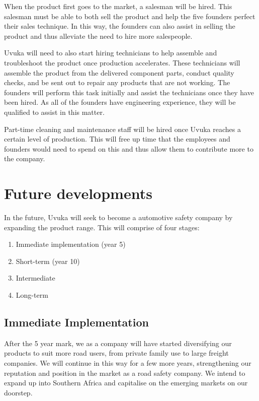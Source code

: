 When the product first goes to the market, a salesman will be hired. This salesman must be able to both sell the product and help the five founders perfect their sales technique. In this way, the founders can also assist in selling the product and thus alleviate the need to hire more salespeople.

Uvuka will need to also start hiring technicians to help assemble and troubleshoot the product once production accelerates. These technicians will assemble the product from the delivered component parts, conduct quality checks, and be sent out to repair any products that are not working. The founders will perform this task initially and assist the technicians once they have been hired. As all of the founders have engineering experience, they will be qualified to assist in this matter.

Part-time cleaning and maintenance staff will be hired once Uvuka reaches a certain level of production. This will free up time that the employees and founders would need to spend on this and thus allow them to contribute more to the company.

\section{Future developments}
In the future, Uvuka will seek to become a automotive safety company by expanding the product range. This will comprise of four stages:
\begin{enumerate}
\item Immediate implementation (year 5)
\item Short-term (year 10)
\item Intermediate
\item Long-term
\end{enumerate}

\subsection{Immediate Implementation}
After the 5 year mark, we as a company will have started diversifying our products to suit more road users, from private family use to large freight companies. We will continue in this way for a few more years, strengthening our reputation and position in the market as a road safety company. We intend to expand up into Southern Africa and capitalise on the emerging markets on our doorstep.

